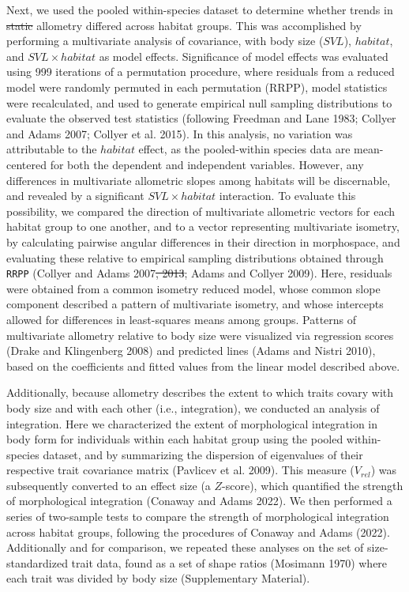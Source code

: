 \documentclass[
  11pt,
]{article}
\providecommand{\DIFaddtex}[1]{{\protect\color{blue}\uwave{#1}}} %
\providecommand{\DIFdeltex}[1]{{\protect\color{red}\sout{#1}}}                      %
\providecommand{\DIFaddbegin}{} %
\providecommand{\DIFaddend}{} %
\providecommand{\DIFdelbegin}{} %
\providecommand{\DIFdelend}{} %
\providecommand{\DIFadd}[1]{\texorpdfstring{\DIFaddtex{#1}}{#1}} %
\providecommand{\DIFdel}[1]{\texorpdfstring{\DIFdeltex{#1}}{}} %
\newcommand{\DIFscaledelfig}{0.5}
\newlength{\DIFdelgraphicswidth} %
\newlength{\DIFdelgraphicsheight} %
\newcommand{\DIFaddincludegraphics}[2][]{{\color{blue}\fbox{\DIFOincludegraphics[#1]{#2}}}} %
\newcommand{\DIFdelincludegraphics}[2][]{%
\sbox{\DIFdelgraphicsbox}{\DIFOincludegraphics[#1]{#2}}%
\settoboxwidth{\DIFdelgraphicswidth}{\DIFdelgraphicsbox} %
\settoboxtotalheight{\DIFdelgraphicsheight}{\DIFdelgraphicsbox} %
\scalebox{\DIFscaledelfig}{%
\parbox[b]{\DIFdelgraphicswidth}{\usebox{\DIFdelgraphicsbox}\\[-\baselineskip] \rule{\DIFdelgraphicswidth}{0em}}\llap{\resizebox{\DIFdelgraphicswidth}{\DIFdelgraphicsheight}{%
\setlength{\unitlength}{\DIFdelgraphicswidth}%
\begin{picture}(1,1)%
\thicklines\linethickness{2pt} %
{\color[rgb]{1,0,0}\put(0,0){\framebox(1,1){}}}%
{\color[rgb]{1,0,0}\put(0,0){\line( 1,1){1}}}%
{\color[rgb]{1,0,0}\put(0,1){\line(1,-1){1}}}%
\end{picture}%
}\hspace*{3pt}}} %
} %
\DeclareRobustCommand{\DIFaddbegin}{\DIFOaddbegin \let\includegraphics\DIFaddincludegraphics} %
\DeclareRobustCommand{\DIFaddend}{\DIFOaddend \let\includegraphics\DIFOincludegraphics} %
\DeclareRobustCommand{\DIFdelbegin}{\DIFOdelbegin \let\includegraphics\DIFdelincludegraphics} %
\DeclareRobustCommand{\DIFdelend}{\DIFOaddend \let\includegraphics\DIFOincludegraphics} %
\begin{document}
Next, we used the pooled within-species dataset to determine whether
trends in \DIFdelbegin \DIFdel{static }\DIFdelend \DIFaddbegin \DIFadd{instraspe }\DIFaddend allometry differed across habitat groups. This was
accomplished by performing a multivariate analysis of covariance, with
body size (\(SVL\)), \(habitat\), and \(SVL \times habitat\) as model
effects. Significance of model effects was evaluated using 999
iterations of a permutation procedure, where residuals from a reduced
model were randomly permuted in each permutation (RRPP), model
statistics were recalculated, and used to generate empirical null
sampling distributions to evaluate the observed test statistics
(following Freedman and Lane 1983; Collyer and Adams 2007; Collyer et
al. 2015). In this analysis, no variation was attributable to the
\(habitat\) effect, as the pooled-within species data are mean-centered
for both the dependent and independent variables. However, any
differences in multivariate allometric slopes among habitats will be
discernable, and revealed by a significant \(SVL \times habitat\)
interaction. To evaluate this possibility, we compared the direction of
multivariate allometric vectors for each habitat group to one another,
and to a vector representing multivariate isometry, by calculating
pairwise angular differences in their direction in morphospace, and
evaluating these relative to empirical sampling distributions obtained
through \texttt{RRPP} (Collyer and Adams 2007\DIFdelbegin \DIFdel{, 2013}\DIFdelend ; Adams and Collyer 2009\DIFaddbegin \DIFadd{;
Collyer and Adams 2013}\DIFaddend ). Here, residuals were obtained from a common
isometry reduced model, whose common slope component described a pattern
of multivariate isometry, and whose intercepts allowed for differences
in least-squares means among groups. Patterns of multivariate allometry
relative to body size were visualized via regression scores (Drake and
Klingenberg 2008) and predicted lines (Adams and Nistri 2010), based on
the coefficients and fitted values from the linear model described
above. \hfill\break

Additionally, because allometry describes the extent to which traits
covary with body size and with each other (i.e., integration), we
conducted an analysis of integration. Here we characterized the extent
of morphological integration in body form for individuals within each
habitat group using the pooled within-species dataset, and by
summarizing the dispersion of eigenvalues of their respective trait
covariance matrix (Pavlicev et al. 2009). This measure (\(V_{rel}\)) was
subsequently converted to an effect size (a \(Z\)-score), which
quantified the strength of morphological integration (Conaway and Adams
2022). We then performed a series of two-sample tests to compare the
strength of morphological integration across habitat groups, following
the procedures of Conaway and Adams (2022). Additionally and for
comparison, we repeated these analyses on the set of size-standardized
trait data, found as a set of shape ratios (Mosimann 1970) where each
trait was divided by body size (Supplementary Material). \hfill\break
\end{document}
